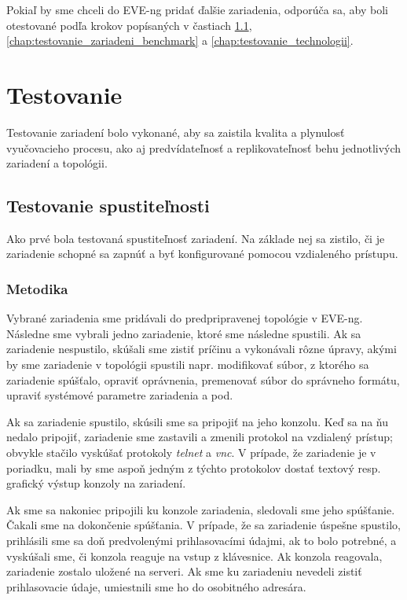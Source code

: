 Pokiaľ by sme chceli do EVE-ng pridať ďalšie zariadenia, odporúča sa, aby boli otestované podľa krokov popísaných v častiach \ref{chap:test_spust}, \ref{chap:testovanie_zariadeni_benchmark} a \ref{chap:testovanie_technologii}.






\section{Testovanie}
\label{chap:testovanie_zariadeni}

Testovanie zariadení bolo vykonané, aby sa zaistila kvalita a plynulosť vyučovacieho procesu, ako aj predvídateľnosť a replikovateľnosť behu jednotlivých zariadení a topológii.




\subsection{Testovanie spustiteľnosti}
\label{chap:test_spust}

Ako prvé bola testovaná spustiteľnosť zariadení. Na základe nej sa zistilo, či je zariadenie schopné sa zapnúť a byť konfigurované pomocou vzdialeného prístupu.



\subsubsection{Metodika}

Vybrané zariadenia sme pridávali do predpripravenej topológie v EVE-ng. Následne sme vybrali jedno zariadenie, ktoré sme následne spustili. Ak sa zariadenie nespustilo, skúšali sme zistiť príčinu a vykonávali rôzne úpravy, akými by sme zariadenie v topológii spustili napr. modifikovať súbor, z ktorého sa zariadenie spúšťalo, opraviť oprávnenia, premenovať súbor do správneho formátu, upraviť systémové parametre zariadenia a pod.

Ak sa zariadenie spustilo, skúsili sme sa pripojiť na jeho konzolu. Keď sa na ňu nedalo pripojiť, zariadenie sme zastavili a zmenili protokol na vzdialený prístup; obvykle stačilo vyskúšať protokoly \emph{telnet} a \emph{vnc}. V prípade, že zariadenie je v poriadku, mali by sme aspoň jedným z týchto protokolov dostať textový resp. grafický výstup konzoly na zariadení.

Ak sme sa nakoniec pripojili ku konzole zariadenia, sledovali sme jeho spúšťanie. Čakali sme na dokončenie spúšťania. V prípade, že sa zariadenie úspešne spustilo, prihlásili sme sa doň predvolenými prihlasovacími údajmi, ak to bolo potrebné, a vyskúšali sme, či konzola reaguje na vstup z klávesnice. Ak konzola reagovala, zariadenie zostalo uložené na serveri. Ak sme ku zariadeniu nevedeli zistiť prihlasovacie údaje, umiestnili sme ho do osobitného adresára.

